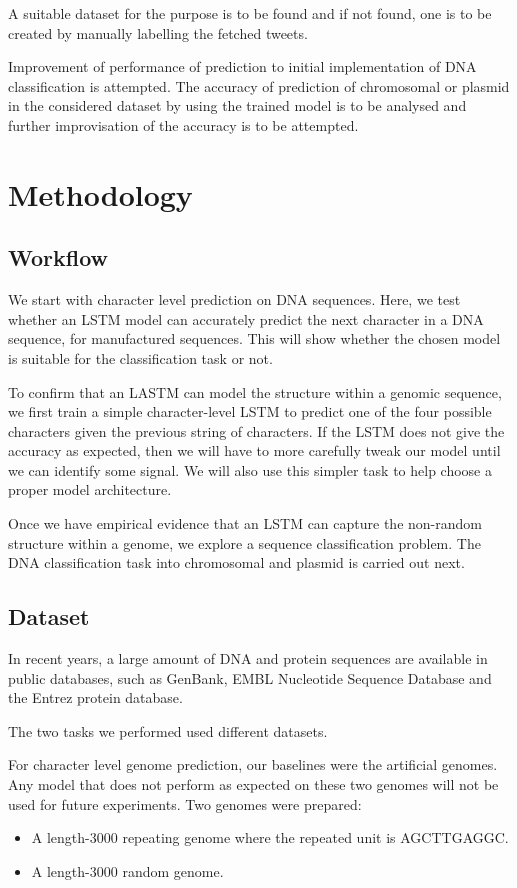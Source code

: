 \documentclass[conference]{IEEEtran}
\begin{document}
A suitable dataset for the purpose is to be found and if not found, one is to be created by manually labelling the fetched tweets.

Improvement of performance of prediction to initial implementation of DNA classification is attempted. The accuracy of prediction of chromosomal or plasmid in the considered dataset by using the trained model is to be analysed and further improvisation of the accuracy is to be attempted.


\section{Methodology}   

\subsection{Workflow}
We start with character level prediction on DNA sequences. Here, we test whether an LSTM model can accurately predict the next character in a DNA sequence, for manufactured sequences. This will show whether the chosen model is suitable for the classification task or not.

To confirm that an LASTM can model the structure within a genomic sequence, we first train a simple character-level LSTM to predict one of the four possible characters given the previous string of characters. If the LSTM does not give the accuracy as expected, then we will have to more carefully tweak our model until we can identify some signal. We will also use this simpler task to help choose a proper model architecture. 

Once we have empirical evidence that an LSTM can capture the non-random structure within a genome, we explore a sequence classification problem. The DNA classification task into chromosomal and plasmid is carried out next.

\subsection{Dataset}
In recent years, a large amount of DNA and protein sequences are available in public databases, such as GenBank, EMBL Nucleotide Sequence Database and the Entrez protein database.

The two tasks we performed used different datasets.

For character level genome prediction, our baselines were the artificial genomes. Any model that does not perform as expected on these two genomes will not be used for future experiments.
Two genomes were prepared:
\begin{itemize}
    \item A length-3000 repeating genome where the repeated unit is AGCTTGAGGC.
    \item A length-3000 random genome.
\end{itemize}
\end{document}
